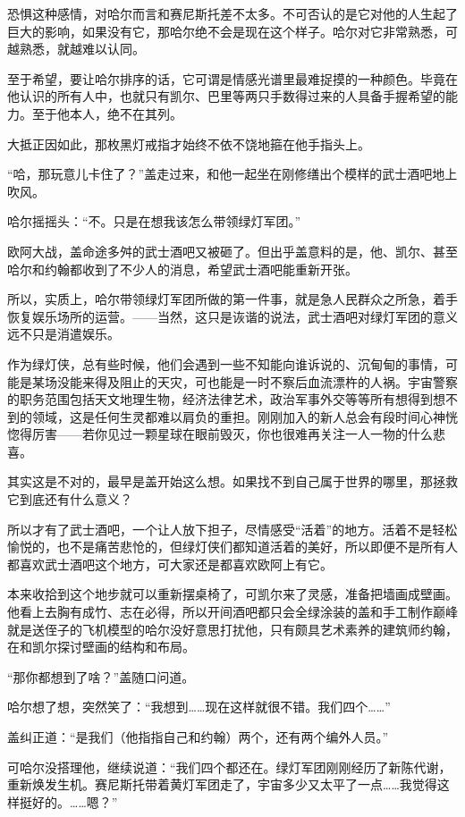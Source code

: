 \documentclass[../main]{subfiles}
\begin{document}
恐惧这种感情，对哈尔而言和赛尼斯托差不太多。不可否认的是它对他的人生起了巨大的影响，如果没有它，那哈尔绝不会是现在这个样子。哈尔对它非常熟悉，可越熟悉，就越难以认同。

至于希望，要让哈尔排序的话，它可谓是情感光谱里最难捉摸的一种颜色。毕竟在他认识的所有人中，也就只有凯尔、巴里等两只手数得过来的人具备手握希望的能力。至于他本人，绝不在其列。

大抵正因如此，那枚黑灯戒指才始终不依不饶地箍在他手指头上。

“哈，那玩意儿卡住了？”盖走过来，和他一起坐在刚修缮出个模样的武士酒吧地上吹风。

哈尔摇摇头：“不。只是在想我该怎么带领绿灯军团。”

欧阿大战，盖命途多舛的武士酒吧又被砸了。但出乎盖意料的是，他、凯尔、甚至哈尔和约翰都收到了不少人的消息，希望武士酒吧能重新开张。

所以，实质上，哈尔带领绿灯军团所做的第一件事，就是急人民群众之所急，着手恢复娱乐场所的运营。——当然，这只是诙谐的说法，武士酒吧对绿灯军团的意义远不只是消遣娱乐。

作为绿灯侠，总有些时候，他们会遇到一些不知能向谁诉说的、沉甸甸的事情，可能是某场没能来得及阻止的天灾，可也能是一时不察后血流漂杵的人祸。宇宙警察的职务范围包括天文地理生物，经济法律艺术，政治军事外交等等所有想得到想不到的领域，这是任何生灵都难以肩负的重担。刚刚加入的新人总会有段时间心神恍惚得厉害——若你见过一颗星球在眼前毁灭，你也很难再关注一人一物的什么悲喜。

其实这是不对的，最早是盖开始这么想。如果找不到自己属于世界的哪里，那拯救它到底还有什么意义？

所以才有了武士酒吧，一个让人放下担子，尽情感受“活着”的地方。活着不是轻松愉悦的，也不是痛苦悲怆的，但绿灯侠们都知道活着的美好，所以即便不是所有人都喜欢武士酒吧这个地方，可大家还是都喜欢欧阿上有它。

本来收拾到这个地步就可以重新摆桌椅了，可凯尔来了灵感，准备把墙画成壁画。他看上去胸有成竹、志在必得，所以开间酒吧都只会全绿涂装的盖和手工制作巅峰就是送侄子的飞机模型的哈尔没好意思打扰他，只有颇具艺术素养的建筑师约翰，在和凯尔探讨壁画的结构和布局。

“那你都想到了啥？”盖随口问道。

哈尔想了想，突然笑了：“我想到……现在这样就很不错。我们四个……”

盖纠正道：“是我们（他指指自己和约翰）两个，还有两个编外人员。”

可哈尔没搭理他，继续说道：“我们四个都还在。绿灯军团刚刚经历了新陈代谢，重新焕发生机。赛尼斯托带着黄灯军团走了，宇宙多少又太平了一点……我觉得这样挺好的。……嗯？”
\end{document}
